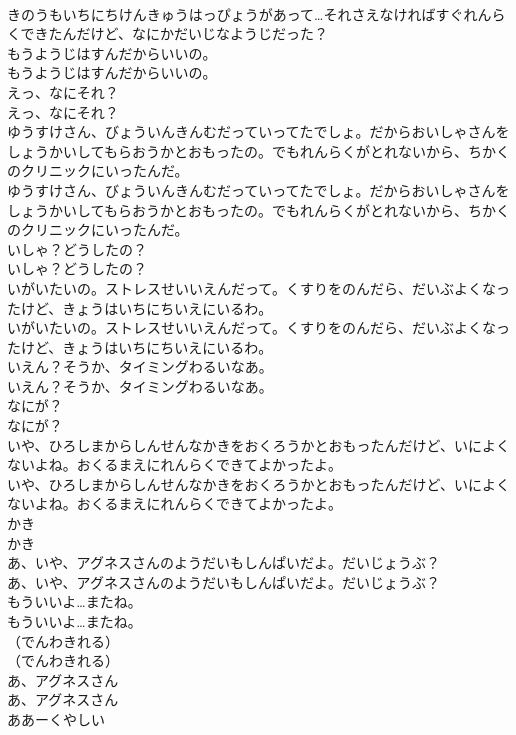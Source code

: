 \documentclass[8pt]{extreport}
\begin{document}
\begin{CJK}{UTF8}{min}
\\	きのうもいちにちけんきゅうはっぴょうがあって…それさえなければすぐれんらくできたんだけど、なにかだいじなようじだった？
\\	もうようじはすんだからいいの。
\\	もうようじはすんだからいいの。
\\	えっ、なにそれ？
\\	えっ、なにそれ？
\\	ゆうすけさん、びょういんきんむだっていってたでしょ。だからおいしゃさんをしょうかいしてもらおうかとおもったの。でもれんらくがとれないから、ちかくのクリニックにいったんだ。
\\	ゆうすけさん、びょういんきんむだっていってたでしょ。だからおいしゃさんをしょうかいしてもらおうかとおもったの。でもれんらくがとれないから、ちかくのクリニックにいったんだ。
\\	いしゃ？どうしたの？
\\	いしゃ？どうしたの？
\\	いがいたいの。ストレスせいいえんだって。くすりをのんだら、だいぶよくなったけど、きょうはいちにちいえにいるわ。
\\	いがいたいの。ストレスせいいえんだって。くすりをのんだら、だいぶよくなったけど、きょうはいちにちいえにいるわ。
\\	いえん？そうか、タイミングわるいなあ。
\\	いえん？そうか、タイミングわるいなあ。
\\	なにが？
\\	なにが？
\\	いや、ひろしまからしんせんなかきをおくろうかとおもったんだけど、いによくないよね。おくるまえにれんらくできてよかったよ。
\\	いや、ひろしまからしんせんなかきをおくろうかとおもったんだけど、いによくないよね。おくるまえにれんらくできてよかったよ。
\\	かき
\\	かき
\\	あ、いや、アグネスさんのようだいもしんぱいだよ。だいじょうぶ？
\\	あ、いや、アグネスさんのようだいもしんぱいだよ。だいじょうぶ？
\\	もういいよ…またね。
\\	もういいよ…またね。
\\	（でんわきれる）
\\	（でんわきれる）
\\	あ、アグネスさん
\\	あ、アグネスさん
\\	ああーくやしい

\end{CJK}
\end{document}
